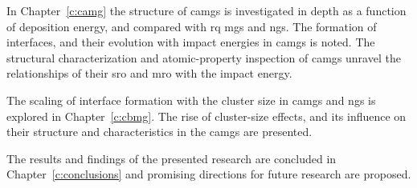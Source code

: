 
In Chapter~\ref{c:camg} the structure of \gls{camg}s is investigated in depth as a function of deposition energy, and compared with \gls{rq} \gls{mg}s and \gls{ng}s. The formation of interfaces, and their evolution with impact energies in \gls{camg}s is noted. The structural characterization and atomic-property inspection of \gls{camg}s unravel the relationships of their \gls{sro} and \gls{mro} with the impact energy. \par

The scaling of interface formation with the cluster size in \gls{camg}s and \gls{ng}s is explored in Chapter~\ref{c:cbmg}. The rise of cluster-size effects, and its influence on their structure and characteristics in the \gls{camg}s are presented. %

The results and findings of the presented research are concluded in Chapter~\ref{c:conclusions} and promising directions for future research are proposed.